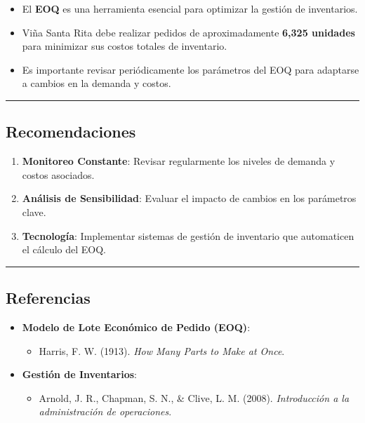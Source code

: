\documentclass[
  letterpaper,
  DIV=11,
  numbers=noendperiod]{scrartcl}
\providecommand{\tightlist}{%
  \setlength{\itemsep}{0pt}\setlength{\parskip}{0pt}}\usepackage{longtable,booktabs,array}
\begin{document}
\begin{itemize}
\tightlist
\item
  El \textbf{EOQ} es una herramienta esencial para optimizar la gestión
  de inventarios.
\item
  Viña Santa Rita debe realizar pedidos de aproximadamente \textbf{6,325
  unidades} para minimizar sus costos totales de inventario.
\item
  Es importante revisar periódicamente los parámetros del EOQ para
  adaptarse a cambios en la demanda y costos.
\end{itemize}

\begin{center}\rule{0.5\linewidth}{0.5pt}\end{center}

\subsection{Recomendaciones}\label{recomendaciones-1}

\begin{enumerate}
\def\labelenumi{\arabic{enumi}.}
\tightlist
\item
  \textbf{Monitoreo Constante}: Revisar regularmente los niveles de
  demanda y costos asociados.
\item
  \textbf{Análisis de Sensibilidad}: Evaluar el impacto de cambios en
  los parámetros clave.
\item
  \textbf{Tecnología}: Implementar sistemas de gestión de inventario que
  automaticen el cálculo del EOQ.
\end{enumerate}

\begin{center}\rule{0.5\linewidth}{0.5pt}\end{center}

\subsection{Referencias}\label{referencias-2}

\begin{itemize}
\tightlist
\item
  \textbf{Modelo de Lote Económico de Pedido (EOQ)}:

  \begin{itemize}
  \tightlist
  \item
    Harris, F. W. (1913). \emph{How Many Parts to Make at Once}.
  \end{itemize}
\item
  \textbf{Gestión de Inventarios}:

  \begin{itemize}
  \tightlist
  \item
    Arnold, J. R., Chapman, S. N., \& Clive, L. M. (2008).
    \emph{Introducción a la administración de operaciones}.
  \end{itemize}
\end{itemize}
\end{document}
